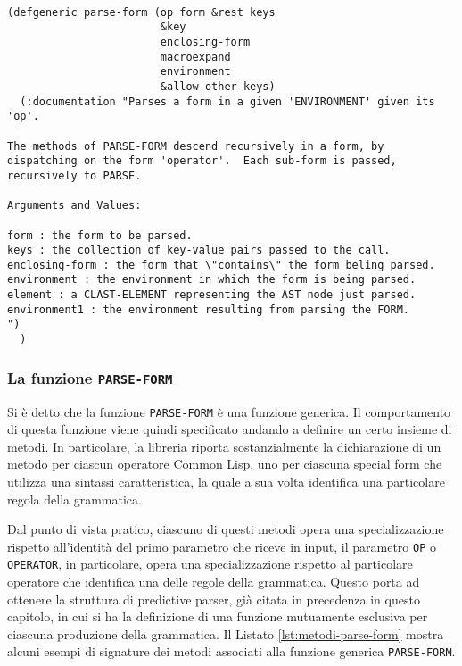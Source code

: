 \begin{lstlisting}[caption=Signature della funzione \texttt{PARSE-FORM}]

(defgeneric parse-form (op form &rest keys
                        &key
                        enclosing-form
                        macroexpand
                        environment
                        &allow-other-keys)
  (:documentation "Parses a form in a given 'ENVIRONMENT' given its 'op'.

The methods of PARSE-FORM descend recursively in a form, by
dispatching on the form 'operator'.  Each sub-form is passed,
recursively to PARSE.

Arguments and Values:

form : the form to be parsed.
keys : the collection of key-value pairs passed to the call.
enclosing-form : the form that \"contains\" the form beling parsed.
environment : the environment in which the form is being parsed.
element : a CLAST-ELEMENT representing the AST node just parsed.
environment1 : the environment resulting from parsing the FORM.
")
  )

\end{lstlisting}

\subsubsection{La funzione \texttt{PARSE-FORM}}

Si è detto che la funzione \texttt{PARSE-FORM} è una funzione generica. Il
comportamento di questa funzione viene quindi specificato andando a definire un
certo insieme di metodi. In particolare, la libreria riporta sostanzialmente la
dichiarazione di un metodo per ciascun operatore Common Lisp, uno per ciascuna
special form che utilizza una sintassi caratteristica, la quale a sua volta
identifica una particolare regola della grammatica.

Dal punto di vista pratico, ciascuno di questi metodi opera una specializzazione
rispetto all’identità del primo parametro che riceve in input, il parametro
\texttt{OP} o \texttt{OPERATOR}, in particolare, opera una specializzazione
rispetto al particolare operatore che identifica una delle regole della
grammatica. Questo porta ad ottenere la struttura di predictive parser, già
citata in precedenza in questo capitolo, in cui si ha la definizione di una
funzione mutuamente esclusiva per ciascuna produzione della grammatica. Il
Listato \ref{lst:metodi-parse-form} mostra alcuni esempi di signature dei metodi
associati alla funzione generica \texttt{PARSE-FORM}.

